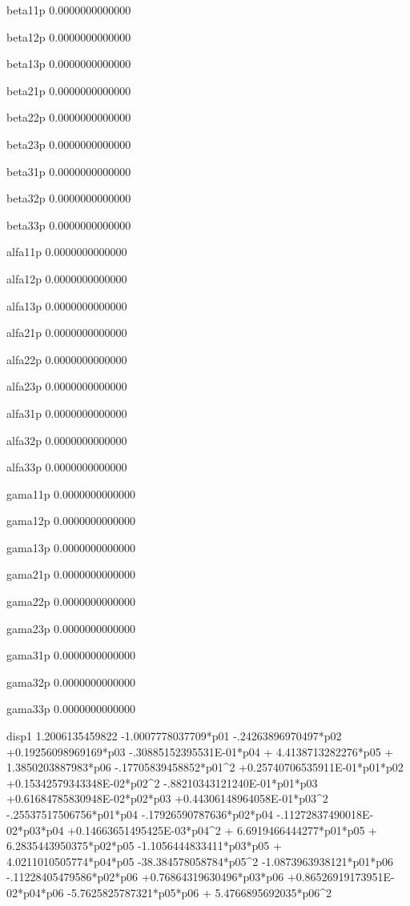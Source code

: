  beta11p
   0.0000000000000 
  
 beta12p
   0.0000000000000 
  
 beta13p
   0.0000000000000 
  
 beta21p
   0.0000000000000 
  
 beta22p
   0.0000000000000 
  
 beta23p
   0.0000000000000 
  
 beta31p
   0.0000000000000 
  
 beta32p
   0.0000000000000 
  
 beta33p
   0.0000000000000 
  
 alfa11p
   0.0000000000000 
  
 alfa12p
   0.0000000000000 
  
 alfa13p
   0.0000000000000 
  
 alfa21p
   0.0000000000000 
  
 alfa22p
   0.0000000000000 
  
 alfa23p
   0.0000000000000 
  
 alfa31p
   0.0000000000000 
  
 alfa32p
   0.0000000000000 
  
 alfa33p
   0.0000000000000 
  
 gama11p
   0.0000000000000 
  
 gama12p
   0.0000000000000 
  
 gama13p
   0.0000000000000 
  
 gama21p
   0.0000000000000 
  
 gama22p
   0.0000000000000 
  
 gama23p
   0.0000000000000 
  
 gama31p
   0.0000000000000 
  
 gama32p
   0.0000000000000 
  
 gama33p
   0.0000000000000 
  
 disp1  
   1.2006135459822  -1.0007778037709*p01  -.24263896970497*p02 +0.19256098969169*p03  -.30885152395531E-01*p04 + 4.4138713282276*p05 + 1.3850203887983*p06  -.17705839458852*p01^2 +0.25740706535911E-01*p01*p02 +0.15342579343348E-02*p02^2  -.88210343121240E-01*p01*p03 +0.61684785830948E-02*p02*p03 +0.44306148964058E-01*p03^2  -.25537517506756*p01*p04  -.17926590787636*p02*p04  -.11272837490018E-02*p03*p04 +0.14663651495425E-03*p04^2 + 6.6919466444277*p01*p05 + 6.2835443950375*p02*p05  -1.1056444833411*p03*p05 + 4.0211010505774*p04*p05  -38.384578058784*p05^2  -1.0873963938121*p01*p06  -.11228405479586*p02*p06 +0.76864319630496*p03*p06 +0.86526919173951E-02*p04*p06  -5.7625825787321*p05*p06 + 5.4766895692035*p06^2 
  
